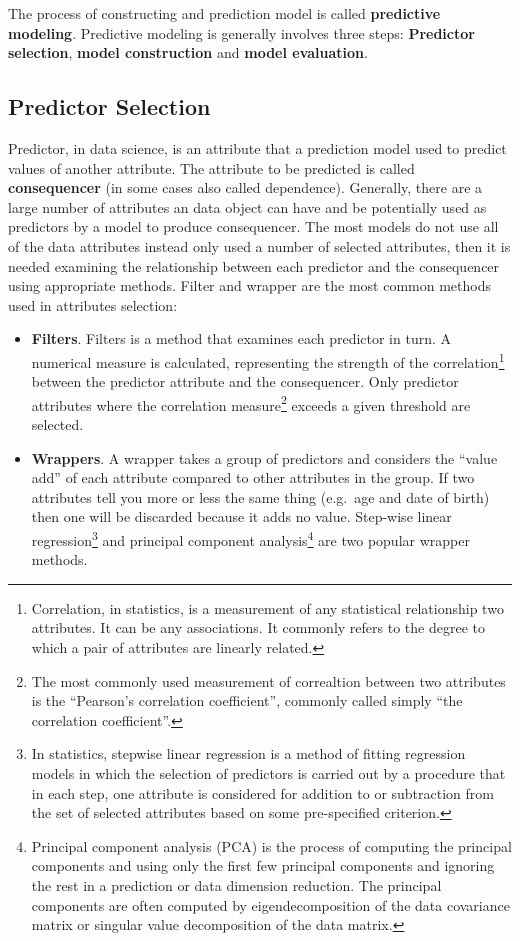 \documentclass[
]{book}
\begin{document}
The process of constructing and prediction model is called \textbf{predictive modeling}. Predictive modeling is generally involves three steps: \textbf{Predictor selection}, \textbf{model construction} and \textbf{model evaluation}.

\hypertarget{predictor-selection}{%
\subsection*{Predictor Selection}\label{predictor-selection}}


Predictor, in data science, is an attribute that a prediction model used to predict values of another attribute. The attribute to be predicted is called \textbf{consequencer} (in some cases also called dependence). Generally, there are a large number of attributes an data object can have and be potentially used as predictors by a model to produce consequencer. The most models do not use all of the data attributes instead only used a number of selected attributes, then it is needed examining the relationship between each predictor and the consequencer using appropriate methods. Filter and wrapper are the most common methods used in attributes selection:

\begin{itemize}
\item
  \textbf{Filters}. Filters is a method that examines each predictor in turn. A numerical measure is calculated, representing the strength of the correlation\footnote{Correlation, in statistics, is a measurement of any statistical relationship two attributes. It can be any associations. It commonly refers to the degree to which a pair of attributes are linearly related.} between the predictor attribute and the consequencer. Only predictor attributes where the correlation measure\footnote{The most commonly used measurement of correaltion between two attributes is the ``Pearson's correlation coefficient'', commonly called simply ``the correlation coefficient''.} exceeds a given threshold are selected.
\item
  \textbf{Wrappers}. A wrapper takes a group of predictors and considers the ``value add'' of each attribute compared to other attributes in the group. If two attributes tell you more or less the same thing (e.g.~age and date of birth) then one will be discarded because it adds no value. Step-wise linear regression\footnote{In statistics, stepwise linear regression is a method of fitting regression models in which the selection of predictors is carried out by a procedure that in each step, one attribute is considered for addition to or subtraction from the set of selected attributes based on some pre-specified criterion.} and principal component analysis\footnote{Principal component analysis (PCA) is the process of computing the principal components and using only the first few principal components and ignoring the rest in a prediction or data dimension reduction. The principal components are often computed by eigendecomposition of the data covariance matrix or singular value decomposition of the data matrix.} are two popular wrapper methods.
\end{itemize}
\end{document}

